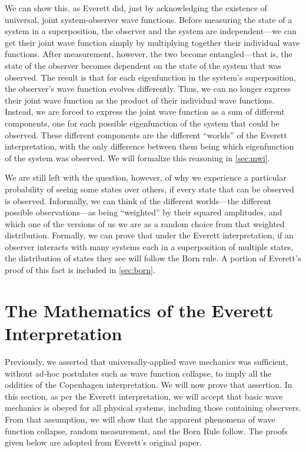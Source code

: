 \documentclass[
    12pt,
    letterpaper,
    aps,
    prd,
    longbibliography,
    twocolumn,
    nofootinbib,
    raggedbottom,
    amsmath,
    amssymb,
    amsfonts,
]{revtex4-1}
\begin{document}
We can show this, as Everett did, just by acknowledging the existence of universal, joint system-observer wave functions.\cite{everett}\cite{relativestate} Before measuring the state of a system in a superposition, the observer and the system are independent---we can get their joint wave function simply by multiplying together their individual wave functions. After measurement, however, the two become entangled---that is, the state of the observer becomes dependent on the state of the system that was observed. The result is that for each eigenfunction in the system's superposition, the observer's wave function evolves differently. Thus, we can no longer express their joint wave function as the product of their individual wave functions. Instead, we are forced to express the joint wave function as a sum of different components, one for each possible eigenfunction of the system that could be observed. These different components are the different ``worlds'' of the Everett interpretation, with the only difference between them being which eigenfunction of the system was observed. We will formalize this reasoning in \autoref{sec:mwi}.

We are still left with the question, however, of why we experience a particular probability of seeing some states over others, if every state that can be observed is observed. Informally, we can think of the different worlds---the different possible observations---as being ``weighted'' by their squared amplitudes, and which one of the versions of us we are as a random choice from that weighted distribution. Formally, we can prove that under the Everett interpretation, if an observer interacts with many systems each in a superposition of multiple states, the distribution of states they see will follow the Born rule.\cite{everett}\cite{relativestate}\cite{bornproof1}\cite{bornproof2}\cite{bornproof3}\cite{bornproof2summary} A portion of Everett's proof of this fact is included in \autoref{sec:born}.

\pagebreak

\section{The Mathematics of the Everett Interpretation}
\label{sec:math}

Previously, we asserted that universally-applied wave mechanics was sufficient, without ad-hoc postulates such as wave function collapse, to imply all the oddities of the Copenhagen interpretation. We will now prove that assertion. In this section, as per the Everett interpretation, we will accept that basic wave mechanics is obeyed for all physical systems, including those containing observers. From that assumption, we will show that the apparent phenomena of wave function collapse, random measurement, and the Born Rule follow. The proofs given below are adopted from Everett's original paper.\cite{everett}\cite{relativestate}
\end{document}
